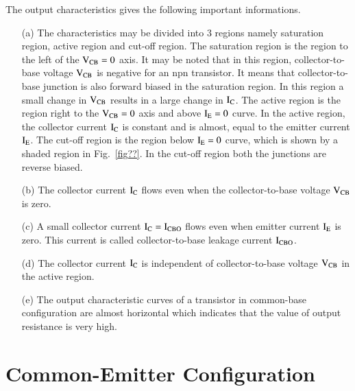 The output characteristics gives the following important informations.
\begin{itemize}
\item[(a)] The characteristics may be divided into 3 regions namely saturation region, active region and cut-off region. The saturation region is the region to the left of the $\textrm{V}_{\text{CB}}=0$ axis. It may be noted that in this region, collector-to-base voltage $\textrm{V}_{\text{CB}}$ is negative for an npn transistor. It means that collector-to-base junction is also forward biased in the saturation region. In this region a small change in $\textrm{V}_{\text{CB}}$ results in a large change in $\textrm{I}_{\textrm{C}}$. The active region is the region right to the $\textrm{V}_{\text{CB}}=0$ axis and above $\textrm{I}_{\textrm{E}}=0$ curve. In the active region, the collector current $\textrm{I}_{\textrm{C}}$ is constant and is almost, equal to the emitter current $\textrm{I}_{\textrm{E}}$. The cut-off region is the region below $\textrm{I}_{\textrm{E}}=0$ curve, which is shown by a shaded region in Fig.~\ref{fig??}. In the cut-off region both the junctions are reverse biased.

\item[(b)] The collector current $\textrm{I}_{\textrm{C}}$ flows even when the collector-to-base voltage $\textrm{V}_{\text{CB}}$ is zero.

\item[(c)] A small collector current $\textrm{I}_{\textrm{C}}=\textrm{I}_{\text{CBO}}$ flows even when emitter current $\textrm{I}_{\textrm{E}}$ is zero. This current is called collector-to-base leakage current $\textrm{I}_{\text{CBO}}$.

\item[(d)] The collector current $\textrm{I}_{\textrm{C}}$ is independent of collector-to-base voltage $\textrm{V}_{\text{CB}}$ in the active region.

\item[(e)] The output characteristic curves of a transistor in common-base configuration are almost horizontal which indicates that the value of output resistance is very high.
\end{itemize}

\section{Common-Emitter Configuration}\label{sec2.5}










\label{2end}
